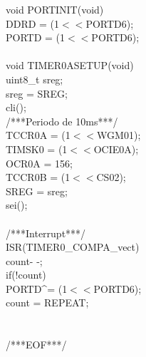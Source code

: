 \documentclass[titlepage, a4paper, 10pt, reqno, openany]{report}
\begin{document}
\begin{minipage}[T]{.3\linewidth}
void PORTINIT(void)\textbraceleft \\
\hspace*{.5cm}	DDRD = (1$<<$PORTD6); \\
\hspace*{.5cm}	PORTD = (1$<<$PORTD6); \\
\textbraceright \\
void TIMER0ASETUP(void)\textbraceleft \\
\hspace*{.5cm}	uint8\_{t} sreg; \\
\hspace*{.5cm}	sreg = SREG; \\
\hspace*{.5cm}	cli(); \\
/***Periodo de 10ms***/ \\
\hspace*{.5cm}	TCCR0A = (1$<<$WGM01); \\
\hspace*{.5cm}	TIMSK0 = (1$<<$OCIE0A); \\
\hspace*{.5cm}	OCR0A = 156; \\
\hspace*{.5cm}	TCCR0B \textbar = (1$<<$CS02); \\
\hspace*{.5cm}	SREG = sreg; \\
\hspace*{.5cm}	sei(); \\
\textbraceright \\
/***Interrupt***/ \\
ISR(TIMER0{\_}COMPA{\_}vect)\textbraceleft \\
\hspace*{.5cm}	count- -; \\
\hspace*{.5cm}	if(!count)\textbraceleft \\
\hspace*{1cm}		PORTD\textasciicircum = (1$<<$PORTD6); \\
\hspace*{1cm}		count = REPEAT; \\
\hspace*{.5cm}	\textbraceright \\
\textbraceright \\
/***EOF***/
\end{minipage}
\qquad
\end{document}
